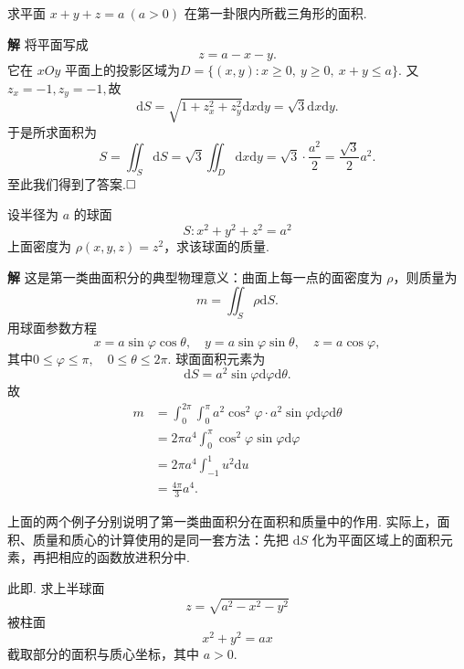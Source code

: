 \documentclass{ctexart}
\newenvironment{custom}[1]{\par\noindent \textbf{#1}\quad}{\par\vspace{1em}}
\begin{document}
\begin{example}
求平面 $x+y+z=a\ (a>0)$ 在第一卦限内所截三角形的面积.
\end{example}

\begin{custom}{解}
将平面写成
\[
z=a-x-y.
\]
它在 $xOy$ 平面上的投影区域为$D=\{(x,y):x\geqslant 0,\ y\geqslant 0,\ x+y\leqslant a\}.$
又$z_{x}=-1,z_{y}=-1,$故
$$\mathrm{d}S=\sqrt{1+z_{x}^{2}+z_{y}^{2}}\mathrm{d}x\mathrm{d}y
=\sqrt{3}\mathrm{d}x\mathrm{d}y.$$
于是所求面积为
$$S=\iint_{S}\mathrm{d}S
=\sqrt{3}\iint_{D}\mathrm{d}x\mathrm{d}y
=\sqrt{3}\cdot \frac{a^{2}}{2}
=\frac{\sqrt{3}}{2}a^{2}.$$
至此我们得到了答案.$\hfill{\square}$
\end{custom}

\begin{example}
设半径为 $a$ 的球面
\[
S:x^{2}+y^{2}+z^{2}=a^{2}
\]
上面密度为 $\rho(x,y,z)=z^{2}$，求该球面的质量.
\end{example}

\begin{custom}{解}
这是第一类曲面积分的典型物理意义：曲面上每一点的面密度为 $\rho$，则质量为
\[
m=\iint_{S}\rho \mathrm{d}S.
\]
用球面参数方程
\[
x=a\sin\varphi\cos\theta,\quad
y=a\sin\varphi\sin\theta,\quad
z=a\cos\varphi,
\]
其中$0\leqslant \varphi\leqslant \pi,\quad 0\leqslant \theta\leqslant 2\pi.$ 球面面积元素为
\[
\mathrm{d}S=a^{2}\sin\varphi \mathrm{d}\varphi\mathrm{d}\theta.
\]
故
\[
\begin{aligned}
m
&=\int_{0}^{2\pi}\int_{0}^{\pi}a^{2}\cos^{2}\varphi\cdot a^{2}\sin\varphi
\mathrm{d}\varphi\mathrm{d}\theta\\
&=2\pi a^{4}\int_{0}^{\pi}\cos^{2}\varphi\sin\varphi \mathrm{d}\varphi\\
&=2\pi a^{4}\int_{-1}^{1}u^{2}\mathrm{d}u\\
&=\frac{4\pi}{3}a^{4}.
\end{aligned}
\]
\end{custom}

上面的两个例子分别说明了第一类曲面积分在面积和质量中的作用. 实际上，面积、质量和质心的计算使用的是同一套方法：先把 $\mathrm{d}S$ 化为平面区域上的面积元素，再把相应的函数放进积分中.

\begin{example}
此即\cite[例题25.1.2]{XHM}. 求上半球面
$$
z=\sqrt{a^{2}-x^{2}-y^{2}}
$$
被柱面
\[
x^{2}+y^{2}=ax
\]
截取部分的面积与质心坐标，其中 $a>0$.
\end{example}
\end{document}
